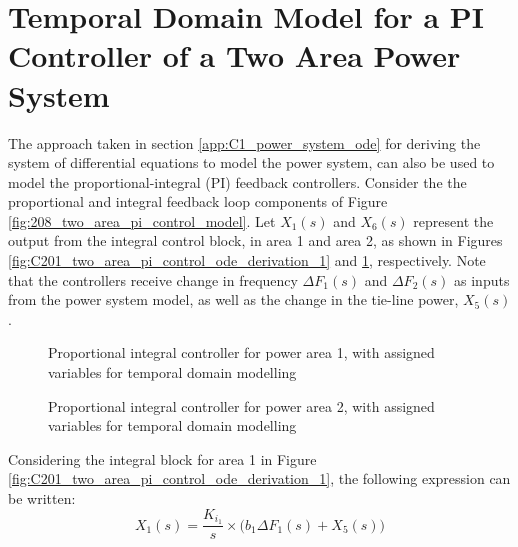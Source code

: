 \section{Temporal Domain Model for a PI Controller of a Two Area Power System} \label{sec:temporal_domain_for_pi_controller}

The approach taken in section \ref{app:C1_power_system_ode} for deriving the system of differential equations to model the power system, can also be used to model the proportional-integral (PI) feedback controllers. Consider the the proportional and integral feedback loop components of Figure \ref{fig:208_two_area_pi_control_model}. Let $X_1(s)$ and $X_6(s)$ represent the output from the integral control block, in area 1 and area 2, as shown in Figures \ref{fig:C201_two_area_pi_control_ode_derivation_1} and \ref{fig:C202_two_area_pi_control_ode_derivation_2}, respectively. Note that the controllers receive change in frequency $\Delta F_1(s)$ and $\Delta F_2(s)$ as inputs from the power system model, as well as the change in the tie-line power, $X_5(s)$.

\begin{figure}[h]
	\begin{minipage}[b]{0.5\textwidth}
		\resizebox{7.0cm}{!}{}
		\caption[PI controller for power area 1]{Proportional integral controller for power area 1, with assigned variables for temporal domain modelling}
		\label{fig:C201_two_area_pi_control_ode_derivation_1}
	\end{minipage}
	\hspace{0.1cm}
	\begin{minipage}[b]{0.5\textwidth}
		\resizebox{7.2cm}{!}{}
		\caption[PI controller for power area 2]{Proportional integral controller for power area 2, with assigned variables for temporal domain modelling}
		\label{fig:C202_two_area_pi_control_ode_derivation_2}
	\end{minipage}
\end{figure}

Considering the integral block for area 1 in Figure \ref{fig:C201_two_area_pi_control_ode_derivation_1}, the following expression can be written:
\begin{equation}
	X_1(s) = \frac{K_{i_1}}{s} \times \big( b_1 \Delta F_1(s) + X_5(s) \big) \label{eq:C201}
\end{equation}

